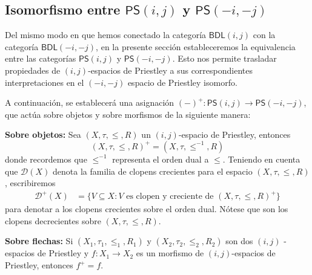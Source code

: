 \documentclass[12pt]{book}
\newcommand{\BDL}{\mathsf{BDL}}
\newcommand{\PS}{\mathsf{PS}}
\begin{document}
\subsection{Isomorfismo entre $\PS(i, j)$ y $\PS(-i,-j)$} \label{S3.3}

Del mismo modo en que hemos conectado la categoría $\BDL(i,j)$ con la categoría $\BDL(-i,-j)$, en la presente sección estableceremos la equivalencia entre las categorías $\PS(i,j)$ y $\PS(-i,-j)$. Esto nos permite trasladar propiedades de  $(i,j)$-espacios de Priestley a sus correspondientes interpretaciones en el $(-i,-j)$ espacio de Priestley isomorfo.

A continuación, se establecerá una asignación  $(-)^{+} \colon \PS(i,j) \to \PS(-i,-j)$, que actúa sobre objetos y sobre morfismos de la siguiente manera: 

\noindent \textbf{Sobre objetos:} Sea $(X,\tau,\le,R)$ un $(i,j)$-espacio de Priestley, entonces
\[ (X,\tau,\leq,R)^{+} = \left(X,\tau,\leq^{-1},R\right) \]
donde recordemos que $\le^{-1}$ representa el orden dual a $\le$. Teniendo en cuenta que $\mathcal{D}(X)$ denota la familia de clopens crecientes para el espacio $(X,\tau,\leq,R)$, escribiremos 
\begin{align*}
\mathcal{D}^{+}(X) &= \{ V \subseteq X : V \text{ es clopen y creciente de } (X,\tau,\leq,R)^{+} \}
\end{align*}
para denotar a los clopens crecientes sobre el orden dual. Nótese que son los clopens decrecientes sobre $(X,\tau,\leq,R)$.

\noindent \textbf{Sobre flechas:} Si $(X_{1},\tau_{1},\leq_{1},R_{1})$ y $(X_{2},\tau_{2},\leq_{2},R_{2})$ son dos $(i,j)$ - espacios de Priestley y $ f \colon X_{1} \to X_{2}$ es un morfismo de $(i,j)$-espacios de Priestley, entonces $f^{+} = f$.  
\end{document}
